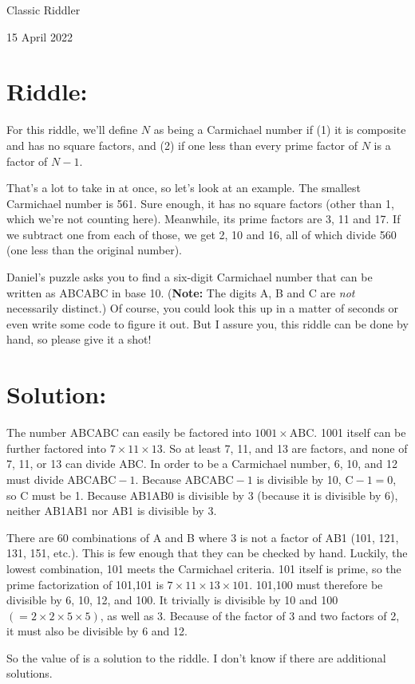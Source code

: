 \documentclass{article}
\begin{document}
\pagestyle{empty} %

\begin{center}
{\LARGE Classic Riddler}

\vspace{0.15in}

{\Large 15 April 2022}
\end{center}


\section*{Riddle:}

For this riddle, we'll define $N$ as being a Carmichael number if (1) it is composite and has no square factors, and (2) if one less than every prime factor of $N$ is a factor of $N-1$.

That's a lot to take in at once, so let's look at an example.
The smallest Carmichael number is 561. Sure enough, it has no square factors (other than 1, which we're not counting here).
Meanwhile, its prime factors are 3, 11 and 17.
If we subtract one from each of those, we get 2, 10 and 16, all of which divide 560 (one less than the original number).

Daniel's puzzle asks you to find a six-digit Carmichael number that can be written as ABCABC in base 10.
(\textbf{Note:} The digits A, B and C are \textit{not} necessarily distinct.)
Of course, you could look this up in a matter of seconds or even write some code to figure it out.
But I assure you, this riddle can be done by hand, so please give it a shot!


\section*{Solution:}

The number ABCABC can easily be factored into $1001\times\mathrm{ABC}$.
1001 itself can be further factored into $7\times11\times13$.
So at least 7, 11, and 13 are factors, and none of 7, 11, or 13 can divide ABC.
In order to be a Carmichael number, 6, 10, and 12 must divide $\mathrm{ABCABC}-1$.
Because $\mathrm{ABCABC}-1$ is divisible by 10, $\mathrm{C}-1=0$, so C must be 1.
Because AB1AB0 is divisible by 3 (because it is divisible by 6), neither AB1AB1 nor AB1 is divisible by 3.

There are 60 combinations of A and B where 3 is not a factor of AB1 (101, 121, 131, 151, etc.).
This is few enough that they can be checked by hand.
Luckily, the lowest combination, 101 meets the Carmichael criteria.
101 itself is prime, so the prime factorization of 101,101 is $7\times11\times13\times101$.
101,100 must therefore be divisible by 6, 10, 12, and 100.
It trivially is divisible by 10 and 100 $(=2\times2\times5\times5)$, as well as 3.
Because of the factor of 3 and two factors of 2, it must also be divisible by 6 and 12.

So the value of  is a solution to the riddle.
I don't know if there are additional solutions.
\end{document}
